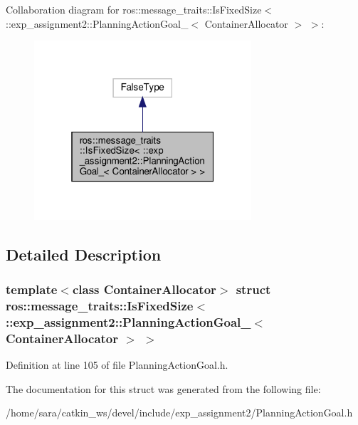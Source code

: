 Collaboration diagram for ros\+:\+:message\+\_\+traits\+:\+:Is\+Fixed\+Size$<$ \+:\+:exp\+\_\+assignment2\+:\+:Planning\+Action\+Goal\+\_\+$<$ Container\+Allocator $>$ $>$\+:
\nopagebreak
\begin{figure}[H]
\begin{center}
\leavevmode
\includegraphics[width=229pt]{structros_1_1message__traits_1_1IsFixedSize_3_01_1_1exp__assignment2_1_1PlanningActionGoal___3_06e060a02bb0ca24665d127e95ce723bb}
\end{center}
\end{figure}


\subsection{Detailed Description}
\subsubsection*{template$<$class Container\+Allocator$>$\newline
struct ros\+::message\+\_\+traits\+::\+Is\+Fixed\+Size$<$ \+::exp\+\_\+assignment2\+::\+Planning\+Action\+Goal\+\_\+$<$ Container\+Allocator $>$ $>$}



Definition at line 105 of file Planning\+Action\+Goal.\+h.



The documentation for this struct was generated from the following file\+:\begin{DoxyCompactItemize}
\item 
/home/sara/catkin\+\_\+ws/devel/include/exp\+\_\+assignment2/Planning\+Action\+Goal.\+h\end{DoxyCompactItemize}
